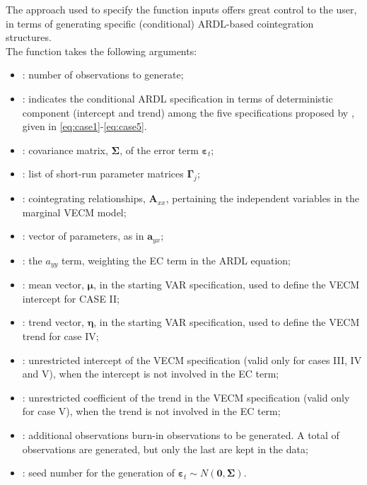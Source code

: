 The approach used to specify the function inputs offers great control to the user, in terms of generating specific (conditional) ARDL-based cointegration structures.\\
The function  takes the following arguments:
\begin{itemize}
    \item {}: number of observations to generate;
    \item {}: indicates the conditional ARDL specification in terms of deterministic component (intercept and trend) among the five specifications proposed by \citet{pesaran2001}, given in \eqref{eq:case1}-\eqref{eq:case5}.
    \item {}: covariance matrix, $\boldsymbol{\Sigma}$, of the error term $\boldsymbol{\varepsilon}_{t}$;
    \item {}: list of short-run parameter matrices $\boldsymbol\Gamma_j$;
    \item {}: cointegrating relationships, $\mathbf{A}_{xx}$, pertaining the independent variables in the marginal VECM model;
    \item {}: vector of parameters, as in $\mathbf{a}_{yx}$;
    \item {}: the $a_{yy}$ term, weighting the EC term in the ARDL equation;
    \item {}: mean vector, $\boldsymbol\mu$, in the starting VAR specification, used to define the VECM intercept for CASE II;
    \item {}: trend vector, $\boldsymbol\eta$, in the starting VAR specification, used to define the VECM trend for case IV;
    \item {}: unrestricted intercept of the VECM specification (valid only for cases III, IV and V), when the intercept is not involved in the EC term;
    \item {}: unrestricted coefficient of the trend in the VECM specification (valid only for case V), when the trend is not involved in the EC term;
    \item {}: additional observations burn-in observations to be generated. A total of  observations are generated, but only the last  are kept in the data;
    \item {}: seed number for the generation of $\boldsymbol{\varepsilon}_{t}\sim N(\mathbf 0,\boldsymbol\Sigma)$.
\end{itemize}
